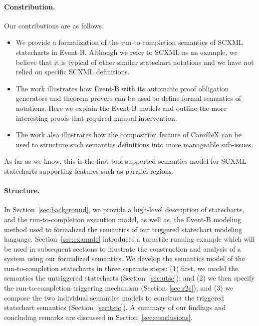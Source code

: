 
\paragraph{Constribution.} Our contributions are as follows.
\begin{itemize}
    \item We provide a formalization of the run-to-completion  semantics of SCXML statecharts in Event-B. Although we  refer to SCXML as  an example, we believe that it is  typical of  other similar statechart  notations and we have not  relied on specific SCXML  definitions. 
    \item The work illustrates how Event-B with its automatic proof obligation generators and theorem provers can be used to  define  formal  semantics of  notations. Here we  explain the Event-B models  and outline the more interesting proofs  that  required manual intervention.
    \item The work also illustrates how the composition feature of CamilleX can be used to structure such semantics definitions into more  manageable sub-issues.
\end{itemize}
As far as we know, this is the first tool-supported semantics model for SCXML statecharts supporting features such as parallel regions.

\paragraph{Structure.} In Section~\ref{sec:background}, we provide a high-level description of statecharts, and the run-to-completion execution model, as well as, the Event-B modeling method used to formalized the semantics of our triggered statechart modeling language. Section~\ref{sec:example} introduces a turnstile running example which will be used in subsequent sections to illustrate the construction and analysis of a system using our formalized semantics.  We develop the semantics model of the run-to-completion statecharts in three separate steps: (1) first, we model the semantics the untriggered statecharts (Section~\ref{sec:utsc}); and (2) we then specify the run-to-completion triggering mechanism (Section~\ref{sec:r2c}); and (3) we compose the two individual semantics models to construct the triggered statechart semantics (Section~\ref{sec:tstc}).
A summary of our findings and concluding remarks are discussed in Section~\ref{sec:conclusions}.